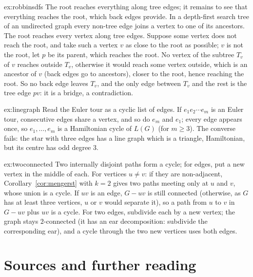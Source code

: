 \begin{solution}{ex:robbinsdfs}
\idea The root reaches everything along tree edges; it remains to see that everything reaches the root, which back edges provide.
\writeup In a depth-first search tree of an undirected graph every non-tree edge joins a vertex to one of its ancestors. The root reaches every vertex
along tree edges. Suppose some vertex does not reach the root, and take such a vertex $v$ as close to the root as possible; $v$ is not the root,
let $p$ be its parent, which reaches the root. No vertex of the subtree $T_v$ of $v$ reaches outside $T_v$, otherwise it would reach some vertex
outside, which is an ancestor of $v$ (back edges go to ancestors), closer to the root, hence reaching the root. So no back edge leaves $T_v$,
and the only edge between $T_v$ and the rest is the tree edge $pv$: it is a bridge, a contradiction.
\end{solution}

\begin{solution}{ex:linegraph}
\idea Read the Euler tour as a cyclic list of edges.
\writeup If $e_1e_2\cdots e_m$ is an Euler tour, consecutive edges share a vertex, and so do $e_m$ and $e_1$; every edge appears once, so $e_1,\dots,e_m$ is a
Hamiltonian cycle of $L(G)$ (for $m\ge3$). The converse fails: the star with three edges has a line graph which is a triangle, Hamiltonian,
but its centre has odd degree $3$.
\end{solution}

\begin{solution}{ex:twoconnected}
\idea Two internally disjoint paths form a cycle; for edges, put a new vertex in the middle of each.
\writeup For vertices $u\ne v$: if they are non-adjacent, Corollary~\ref{cor:mengerst} with $k=2$ gives two paths meeting only at $u$ and $v$, whose union is a
cycle. If $uv$ is an edge, $G-uv$ is still connected (otherwise, as $G$ has at least three vertices, $u$ or $v$ would separate it), so a path
from $u$ to $v$ in $G-uv$ plus $uv$ is a cycle. For two edges, subdivide each by a new vertex; the graph stays $2$-connected (it has an ear
decomposition: subdivide the corresponding ear), and a cycle through the two new vertices uses both edges.
\end{solution}

\section*{Sources and further reading}

